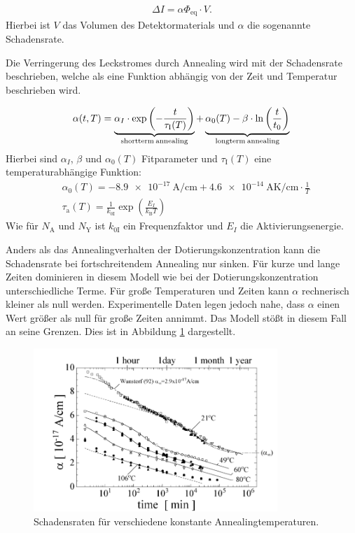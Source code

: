 \begin{align}
  \Delta I = \alpha \Phi_{\mathrm{eq}} \cdot V .
\end{align}
Hierbei ist $V$ das Volumen des Detektormaterials und $\alpha$ die
sogenannte Schadensrate.



Die Verringerung des Leckstromes durch Annealing wird mit der Schadensrate
beschrieben, welche als eine Funktion abhängig von der Zeit und
Temperatur beschrieben wird.\cite{moll}

\begin{align}
  \alpha(t, T) = \underbrace{\alpha_I \cdot \exp{\left(-\frac{t}{\tau_{\mathrm{I}}(T)}\right)}}_{\mathrm{shortterm \: annealing}} + \underbrace{\alpha_{\mathrm{0}}(T) -\beta \cdot \ln{\left(\frac{t}{t_{\mathrm{0}}}\right)}}_{\mathrm{longterm \: annealing}} \text{\label{eqn:damage}}
\end{align}
Hierbei sind $\alpha_I$, $\beta$ und $\alpha_{\mathrm{0}}(T)$ Fitparameter und $\tau_{\mathrm{I}}(T)$ eine
temperaturabhängige Funktion:
\begin{align}
  &\alpha_{\mathrm{0}}(T) = \SI{-8.9e-17}{\ampere\per\centi\meter} + \SI{4.6e-14}{\ampere\kelvin\per\centi\meter} \cdot \frac{1}{T} \\
  &\tau_{\mathrm{a}}(T) = \frac{1}{k_{0\mathrm{I}}}\exp{\left(\frac{E_{I}}{k_{\mathrm{B}}T}\right)}
\end{align}
Wie für $N_{\mathrm{A}}$ und $N_{\mathrm{Y}}$ ist $k_{0\mathrm{I}}$ ein Frequenzfaktor und $E_{I}$ die Aktivierungsenergie.

Anders als das Annealingverhalten der Dotierungskonzentration kann die Schadensrate
bei fortschreitendem Annealing nur sinken. Für kurze und
lange Zeiten dominieren in diesem Modell wie bei der Dotierungskonzentration unterschiedliche
Terme. Für große Temperaturen und Zeiten kann $\alpha$ rechnerisch kleiner als null werden.
Experimentelle Daten legen jedoch nahe, dass $\alpha$ einen Wert größer als null für große Zeiten annimmt.
Das Modell stößt in diesem Fall
an seine Grenzen.
Dies ist in Abbildung \ref{fig:damage_rates} dargestellt.

\begin{figure}
  \centering
  \includegraphics[width=0.82\textwidth]{logos/schadensraten.PNG}
  \caption{Schadensraten für verschiedene konstante Annealingtemperaturen.\cite{moll}}
  \label{fig:damage_rates}
\end{figure}

